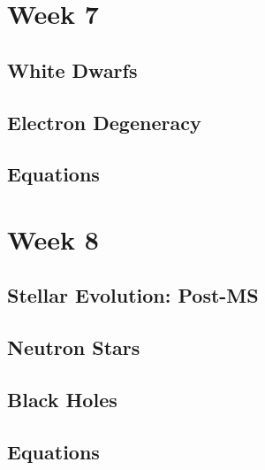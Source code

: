 \documentclass[a4paper,10pt]{article}
\begin{document}
 

\newpage
\section{Week 7}

\subsection{White Dwarfs}

\subsection{Electron Degeneracy}

\subsection{Equations}

\newpage
\section{Week 8}

\subsection{Stellar Evolution: Post-MS}

\subsection{Neutron Stars}

\subsection{Black Holes}

\subsection{Equations}
\end{document}
